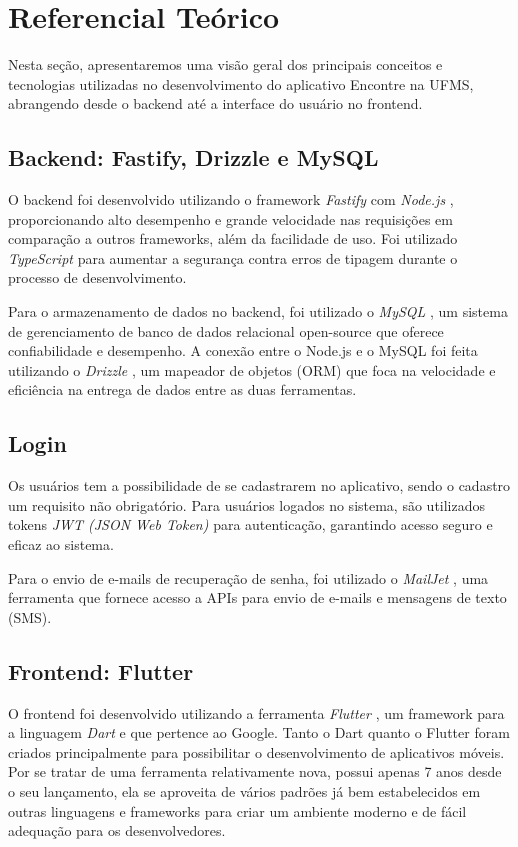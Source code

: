 \section{Referencial Teórico}

Nesta seção, apresentaremos uma visão geral dos principais conceitos e tecnologias utilizadas no desenvolvimento do aplicativo Encontre na UFMS, abrangendo desde o backend até a interface do usuário no frontend.

\subsection{Backend: Fastify, Drizzle e MySQL}
O backend foi desenvolvido utilizando o framework \textit{Fastify} \cite{fastify} com \textit{Node.js} \cite{nodejs}, proporcionando alto desempenho e grande velocidade nas requisições em comparação a outros frameworks, além da facilidade de uso. Foi utilizado \textit{TypeScript} \cite{typescript} para aumentar a segurança contra erros de tipagem durante o processo de desenvolvimento.

Para o armazenamento de dados no backend, foi utilizado o \textit{MySQL} \cite{mysql}, um sistema de gerenciamento de banco de dados relacional open-source que oferece confiabilidade e desempenho. A conexão entre o Node.js e o MySQL foi feita utilizando o \textit{Drizzle} \cite{drizzle}, um mapeador de objetos (ORM) que foca na velocidade e eficiência na entrega de dados entre as duas ferramentas.

\subsection{Login}
Os usuários tem a possibilidade de se cadastrarem no aplicativo, sendo o cadastro um requisito não obrigatório. Para usuários logados no sistema, são utilizados tokens \textit{JWT (JSON Web Token)} \cite{jwt} para autenticação, garantindo acesso seguro e eficaz ao sistema.

Para o envio de e-mails de recuperação de senha, foi utilizado o \textit{MailJet} \cite{mailjet}, uma ferramenta que fornece acesso a APIs para envio de e-mails e mensagens de texto (SMS).

\subsection{Frontend: Flutter}
O frontend foi desenvolvido utilizando a ferramenta \textit{Flutter} \cite{flutter}, um framework para a linguagem \textit{Dart} \cite{dart} e que pertence ao Google. Tanto o Dart quanto o Flutter foram criados principalmente para possibilitar o desenvolvimento de aplicativos móveis. Por se tratar de uma ferramenta relativamente nova, possui apenas 7 anos desde o seu lançamento, ela se aproveita de vários padrões já bem estabelecidos em outras linguagens e frameworks para criar um ambiente moderno e de fácil adequação para os desenvolvedores.

